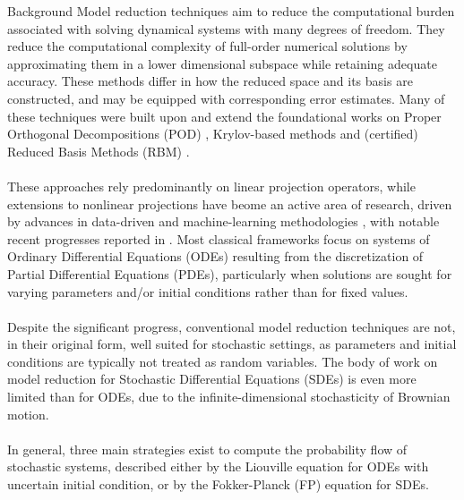 \documentclass[11pt, a4paper, oneside, reqno]{amsart}
\makeatletter
\def\subsection{\@startsection{subsection}{2}%
	\z@{.5\linespacing\@plus.7\linespacing}{.5\linespacing}%
	{\normalfont\large\bfseries}}
\makeatother
\begin{document}
\subsection{Background}
\noindent Model reduction techniques aim to reduce the computational burden associated with solving dynamical systems with many degrees of freedom. 
They reduce the computational complexity of full-order numerical solutions by approximating them in a lower dimensional subspace while retaining adequate accuracy. These methods differ in how the reduced space and its basis are constructed, and may be equipped with corresponding error estimates. Many of these techniques were built upon and extend the foundational works on Proper Orthogonal Decompositions (POD) \cite{POD, rathinam,rowley}, Krylov-based methods \cite{BAI20029,SCHMID_2010} and (certified) Reduced Basis Methods (RBM) \cite{quarteroni,hesthaven2015model}. \\ \ \\
These approaches rely predominantly on linear projection operators, while extensions to nonlinear projections have beome an active area of research, driven by advances in data-driven and machine-learning methodologies \cite{qian2019transform,qian2022reduced,willcox2024distributed,lee2020model}, with notable recent progresses reported in \cite{schwerdtner2024greedy,otto2024role,buchfink2024model}. Most classical frameworks focus on systems of Ordinary Differential Equations (ODEs) resulting from the discretization of Partial Differential Equations (PDEs), particularly when solutions are sought for varying parameters and/or initial conditions rather than for fixed values.  \\ \ \\ 
Despite the significant progress, conventional model reduction techniques are not, in their original form, well suited for stochastic settings, as parameters and initial conditions are typically not treated as random variables. The body of work on model reduction for Stochastic Differential Equations (SDEs) is even more limited than for ODEs, due to the infinite-dimensional stochasticity of Brownian motion. \\ \ \\ 
In general, three main strategies exist to compute the probability flow of stochastic systems, described either by the Liouville equation \cite{Evans_Morriss_2008} for ODEs with uncertain initial condition, or by the Fokker-Planck (FP) equation \cite{risken1989fokker} for SDEs. 
\end{document}
